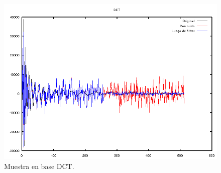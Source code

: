 \documentclass[a4paper,10pt,twoside]{article}
\begin{document}
\begin{figure}[H]
  \centering
  \includegraphics[width=15cm]{graficos/dopp_impulsivo_atenuar_dct.png} 
  \caption{Muestra en base DCT.}
\end{figure}







\end{document}
